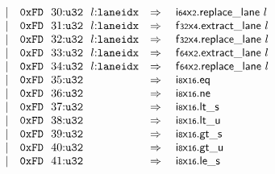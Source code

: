 $$\begin{array}[t]{@{}lrrl@{}l@{}l@{}l@{}}
& & | & \mathtt{0xFD}~~30{:}{\mathtt{u32}}~~l{:}{\mathtt{laneidx}} & \quad\Rightarrow\quad{} & {\mathsf{i{\scriptstyle 64}}}{\mathsf{x}}{\mathsf{{\scriptstyle 2}}}{.}\mathsf{replace\_lane}~l \\
& & | & \mathtt{0xFD}~~31{:}{\mathtt{u32}}~~l{:}{\mathtt{laneidx}} & \quad\Rightarrow\quad{} & {\mathsf{f{\scriptstyle 32}}}{\mathsf{x}}{\mathsf{{\scriptstyle 4}}}{.}\mathsf{extract\_lane}~l \\
& & | & \mathtt{0xFD}~~32{:}{\mathtt{u32}}~~l{:}{\mathtt{laneidx}} & \quad\Rightarrow\quad{} & {\mathsf{f{\scriptstyle 32}}}{\mathsf{x}}{\mathsf{{\scriptstyle 4}}}{.}\mathsf{replace\_lane}~l \\
& & | & \mathtt{0xFD}~~33{:}{\mathtt{u32}}~~l{:}{\mathtt{laneidx}} & \quad\Rightarrow\quad{} & {\mathsf{f{\scriptstyle 64}}}{\mathsf{x}}{\mathsf{{\scriptstyle 2}}}{.}\mathsf{extract\_lane}~l \\
& & | & \mathtt{0xFD}~~34{:}{\mathtt{u32}}~~l{:}{\mathtt{laneidx}} & \quad\Rightarrow\quad{} & {\mathsf{f{\scriptstyle 64}}}{\mathsf{x}}{\mathsf{{\scriptstyle 2}}}{.}\mathsf{replace\_lane}~l \\
& & | & \mathtt{0xFD}~~35{:}{\mathtt{u32}} & \quad\Rightarrow\quad{} & {\mathsf{i{\scriptstyle 8}}}{\mathsf{x}}{\mathsf{{\scriptstyle 16}}} {.} \mathsf{eq} \\
& & | & \mathtt{0xFD}~~36{:}{\mathtt{u32}} & \quad\Rightarrow\quad{} & {\mathsf{i{\scriptstyle 8}}}{\mathsf{x}}{\mathsf{{\scriptstyle 16}}} {.} \mathsf{ne} \\
& & | & \mathtt{0xFD}~~37{:}{\mathtt{u32}} & \quad\Rightarrow\quad{} & {\mathsf{i{\scriptstyle 8}}}{\mathsf{x}}{\mathsf{{\scriptstyle 16}}} {.} {\mathsf{lt}}{\mathsf{\_}}{\mathsf{s}} \\
& & | & \mathtt{0xFD}~~38{:}{\mathtt{u32}} & \quad\Rightarrow\quad{} & {\mathsf{i{\scriptstyle 8}}}{\mathsf{x}}{\mathsf{{\scriptstyle 16}}} {.} {\mathsf{lt}}{\mathsf{\_}}{\mathsf{u}} \\
& & | & \mathtt{0xFD}~~39{:}{\mathtt{u32}} & \quad\Rightarrow\quad{} & {\mathsf{i{\scriptstyle 8}}}{\mathsf{x}}{\mathsf{{\scriptstyle 16}}} {.} {\mathsf{gt}}{\mathsf{\_}}{\mathsf{s}} \\
& & | & \mathtt{0xFD}~~40{:}{\mathtt{u32}} & \quad\Rightarrow\quad{} & {\mathsf{i{\scriptstyle 8}}}{\mathsf{x}}{\mathsf{{\scriptstyle 16}}} {.} {\mathsf{gt}}{\mathsf{\_}}{\mathsf{u}} \\
& & | & \mathtt{0xFD}~~41{:}{\mathtt{u32}} & \quad\Rightarrow\quad{} & {\mathsf{i{\scriptstyle 8}}}{\mathsf{x}}{\mathsf{{\scriptstyle 16}}} {.} {\mathsf{le}}{\mathsf{\_}}{\mathsf{s}} \\

\end{array}$$
